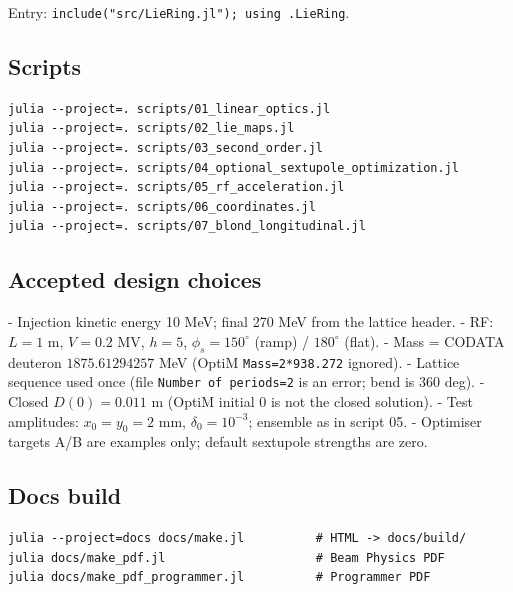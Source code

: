 \documentclass[11pt,a4paper]{article}
\begin{document}
Entry: \texttt{include("src/LieRing.jl"); using .LieRing}.

\subsection{Scripts}

\begin{verbatim}
julia --project=. scripts/01_linear_optics.jl
julia --project=. scripts/02_lie_maps.jl
julia --project=. scripts/03_second_order.jl
julia --project=. scripts/04_optional_sextupole_optimization.jl
julia --project=. scripts/05_rf_acceleration.jl
julia --project=. scripts/06_coordinates.jl
julia --project=. scripts/07_blond_longitudinal.jl
\end{verbatim}

\subsection{Accepted design choices}

- Injection kinetic energy 10 MeV; final 270 MeV from the lattice header.
- RF: $L=1$ m, $V=0.2$ MV, $h=5$, $\phi_s=150^\circ$ (ramp) / $180^\circ$ (flat).
- Mass = CODATA deuteron $1875.61294257$ MeV (OptiM \texttt{Mass=2*938.272} ignored).
- Lattice sequence used once (file \texttt{Number of periods=2} is an error; bend is 360 deg).
- Closed $D(0)=0.011$ m (OptiM initial 0 is not the closed solution).
- Test amplitudes: $x_0=y_0=2$ mm, $\delta_0=10^{-3}$; ensemble as in script 05.
- Optimiser targets A/B are examples only; default sextupole strengths are zero.

\subsection{Docs build}

\begin{verbatim}
julia --project=docs docs/make.jl          # HTML -> docs/build/
julia docs/make_pdf.jl                     # Beam Physics PDF
julia docs/make_pdf_programmer.jl          # Programmer PDF
\end{verbatim}
\end{document}
